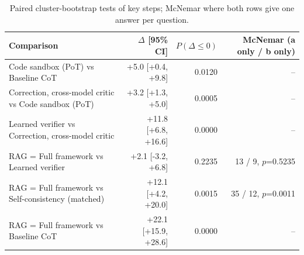 \begin{table}[t]
\centering
\footnotesize
\caption{Paired cluster-bootstrap tests of key steps; McNemar where both rows give one answer per question.}
\label{tab:sig}
\setlength{\tabcolsep}{3.5pt}
\begin{tabular}{lrrr}
\toprule
Comparison & $\Delta$ [95\% CI] & $P(\Delta\le0)$ & McNemar (a only / b only) \\
\midrule
Code sandbox (PoT) vs Baseline CoT & +5.0 [+0.4, +9.8] & 0.0120 & -- \\
Correction, cross-model critic vs Code sandbox (PoT) & +3.2 [+1.3, +5.0] & 0.0005 & -- \\
Learned verifier vs Correction, cross-model critic & +11.8 [+6.8, +16.6] & 0.0000 & -- \\
RAG = Full framework vs Learned verifier & +2.1 [-3.2, +6.8] & 0.2235 & 13 / 9, $p$=0.5235 \\
RAG = Full framework vs Self-consistency (matched) & +12.1 [+4.2, +20.0] & 0.0015 & 35 / 12, $p$=0.0011 \\
RAG = Full framework vs Baseline CoT & +22.1 [+15.9, +28.6] & 0.0000 & -- \\
\bottomrule
\end{tabular}
\end{table}
